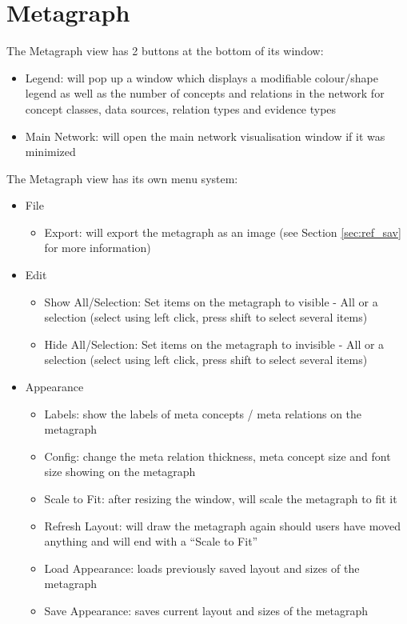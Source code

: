 \section{Metagraph}
\label{sec:ref_metagraph}

The Metagraph view has 2 buttons at the bottom of its window:
\begin{itemize}
\item Legend: will pop up a window which displays a modifiable colour/shape legend as well as 
the number of concepts and relations in the network for concept classes, data sources, relation types and evidence types
\item Main Network: will open the main network visualisation window if it was minimized 
\end{itemize}

The Metagraph view has its own menu system:
\begin{itemize}
\item File
	\begin{itemize}
	\item Export: will export the metagraph as an image (see Section \ref{sec:ref_sav} for more information)
	\end{itemize}
\item Edit
	\begin{itemize}
	\item Show All/Selection: Set items on the metagraph to visible - All or a selection (select using left click, press shift to select several items)
	\item Hide All/Selection: Set items on the metagraph to invisible - All or a selection (select using left click, press shift to select several items)
	\end{itemize}
\item Appearance
	\begin{itemize}
	\item Labels: show the labels of meta concepts / meta relations on the metagraph
	\item Config: change the meta relation thickness, meta concept size and font size showing on the metagraph
	\item Scale to Fit: after resizing the window, will scale the metagraph to fit it
	\item Refresh Layout: will draw the metagraph again should users have moved anything and will end with a ``Scale to Fit''
	\item Load Appearance: loads previously saved layout and sizes of the metagraph
	\item Save Appearance: saves current layout and sizes of the metagraph  
	\end{itemize}
\end{itemize}

